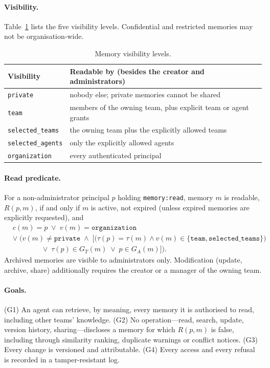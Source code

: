 \documentclass[11pt,a4paper]{article}
\begin{document}
\paragraph{Visibility.} Table~\ref{tab:visibility} lists the five visibility levels. Confidential and
restricted memories may not be organisation-wide.

\begin{table}[htbp]
\centering
\small
\caption{Memory visibility levels.}
\label{tab:visibility}
\begin{tabular}{@{}ll@{}}
\toprule
Visibility & Readable by (besides the creator and administrators) \\
\midrule
\texttt{private} & nobody else; private memories cannot be shared \\
\texttt{team} & members of the owning team, plus explicit team or agent grants \\
\texttt{selected\_teams} & the owning team plus the explicitly allowed teams \\
\texttt{selected\_agents} & only the explicitly allowed agents \\
\texttt{organization} & every authenticated principal \\
\bottomrule
\end{tabular}
\end{table}

\paragraph{Read predicate.} For a non-administrator principal $p$ holding \texttt{memory:read}, memory
$m$ is readable, $R(p,m)$, if and only if $m$ is active, not expired (unless expired memories are
explicitly requested), and
\begin{equation}
\begin{split}
& c(m) = p \;\lor\; v(m) = \texttt{organization} \\
& \lor\; \Big( v(m) \neq \texttt{private} \;\land\; \big[ \big(\tau(p) = \tau(m) \land v(m) \in \{\texttt{team}, \texttt{selected\_teams}\}\big) \\
& \qquad\qquad \lor\; \tau(p) \in G_T(m) \;\lor\; p \in G_A(m) \big] \Big).
\end{split}
\label{eq:read}
\end{equation}
Archived memories are visible to administrators only. Modification (update, archive, share) additionally
requires the creator or a manager of the owning team.

\paragraph{Goals.} (G1) An agent can retrieve, by meaning, every memory it is authorised to read,
including other teams' knowledge. (G2) No operation---read, search, update, version history,
sharing---discloses a memory for which $R(p,m)$ is false, including through similarity ranking,
duplicate warnings or conflict notices. (G3) Every change is versioned and attributable. (G4) Every access
and every refusal is recorded in a tamper-resistant log.
\end{document}

